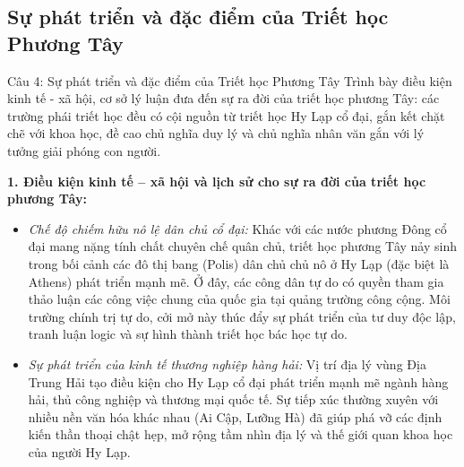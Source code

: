 \documentclass[12pt,a4paper]{article}
\begin{document}
\subsection{Sự phát triển và đặc điểm của Triết học Phương Tây}

\begin{questionbox}{Câu 4: Sự phát triển và đặc điểm của Triết học Phương Tây}
Trình bày điều kiện kinh tế - xã hội, cơ sở lý luận đưa đến sự ra đời của triết học phương Tây: các trường phái triết học đều có cội nguồn từ triết học Hy Lạp cổ đại, gắn kết chặt chẽ với khoa học, đề cao chủ nghĩa duy lý và chủ nghĩa nhân văn gắn với lý tưởng giải phóng con người.
\end{questionbox}

\noindent
\textbf{1. Điều kiện kinh tế -- xã hội và lịch sử cho sự ra đời của triết học phương Tây:}
\begin{itemize}
    \item \textit{Chế độ chiếm hữu nô lệ dân chủ cổ đại:} Khác với các nước phương Đông cổ đại mang nặng tính chất chuyên chế quân chủ, triết học phương Tây nảy sinh trong bối cảnh các đô thị bang (Polis) dân chủ chủ nô ở Hy Lạp (đặc biệt là Athens) phát triển mạnh mẽ. Ở đây, các công dân tự do có quyền tham gia thảo luận các công việc chung của quốc gia tại quảng trường công cộng. Môi trường chính trị tự do, cởi mở này thúc đẩy sự phát triển của tư duy độc lập, tranh luận logic và sự hình thành triết học bác học tự do.
    \item \textit{Sự phát triển của kinh tế thương nghiệp hàng hải:} Vị trí địa lý vùng Địa Trung Hải tạo điều kiện cho Hy Lạp cổ đại phát triển mạnh mẽ ngành hàng hải, thủ công nghiệp và thương mại quốc tế. Sự tiếp xúc thường xuyên với nhiều nền văn hóa khác nhau (Ai Cập, Lưỡng Hà) đã giúp phá vỡ các định kiến thần thoại chật hẹp, mở rộng tầm nhìn địa lý và thế giới quan khoa học của người Hy Lạp.
\end{itemize}
\end{document}

